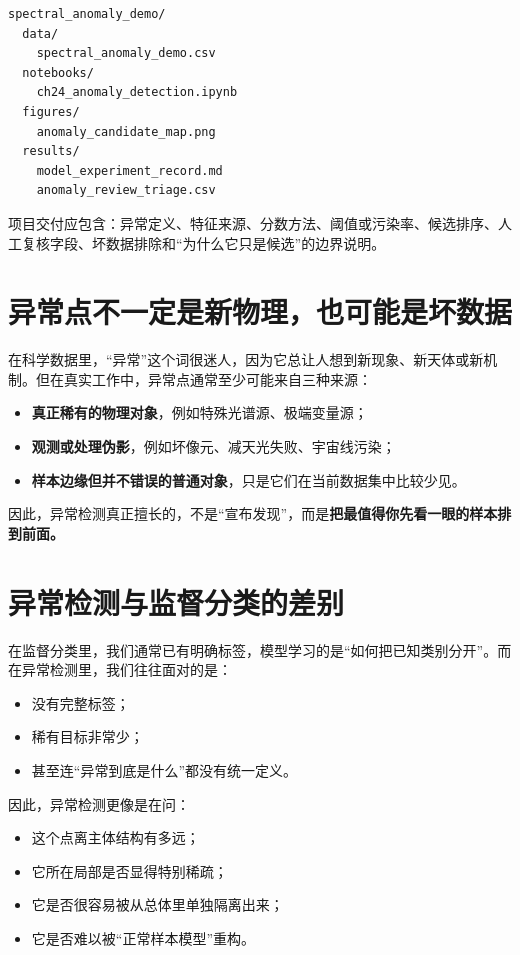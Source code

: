\begin{examplebox}[最小异常检测项目结构]
\begin{lstlisting}[style=terminal]
spectral_anomaly_demo/
  data/
    spectral_anomaly_demo.csv
  notebooks/
    ch24_anomaly_detection.ipynb
  figures/
    anomaly_candidate_map.png
  results/
    model_experiment_record.md
    anomaly_review_triage.csv
\end{lstlisting}
\end{examplebox}

项目交付应包含：异常定义、特征来源、分数方法、阈值或污染率、候选排序、人工复核字段、坏数据排除和“为什么它只是候选”的边界说明。

\section{异常点不一定是新物理，也可能是坏数据}

在科学数据里，“异常”这个词很迷人，因为它总让人想到新现象、新天体或新机制。但在真实工作中，异常点通常至少可能来自三种来源：

\begin{itemize}
    \item \textbf{真正稀有的物理对象}，例如特殊光谱源、极端变量源；
    \item \textbf{观测或处理伪影}，例如坏像元、减天光失败、宇宙线污染；
    \item \textbf{样本边缘但并不错误的普通对象}，只是它们在当前数据集中比较少见。
\end{itemize}

因此，异常检测真正擅长的，不是“宣布发现”，而是\textbf{把最值得你先看一眼的样本排到前面。}

\section{异常检测与监督分类的差别}

在监督分类里，我们通常已有明确标签，模型学习的是“如何把已知类别分开”。而在异常检测里，我们往往面对的是：

\begin{itemize}
    \item 没有完整标签；
    \item 稀有目标非常少；
    \item 甚至连“异常到底是什么”都没有统一定义。
\end{itemize}

因此，异常检测更像是在问：

\begin{itemize}
    \item 这个点离主体结构有多远；
    \item 它所在局部是否显得特别稀疏；
    \item 它是否很容易被从总体里单独隔离出来；
    \item 它是否难以被“正常样本模型”重构。
\end{itemize}

